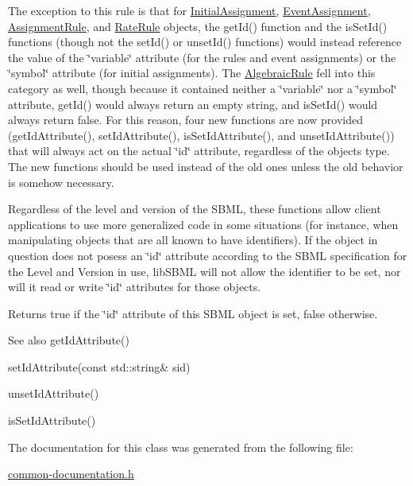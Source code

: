The exception to this rule is that for \hyperlink{class_initial_assignment}{Initial\+Assignment}, \hyperlink{class_event_assignment}{Event\+Assignment}, \hyperlink{class_assignment_rule}{Assignment\+Rule}, and \hyperlink{class_rate_rule}{Rate\+Rule} objects, the get\+Id() function and the is\+Set\+Id() functions (though not the set\+Id() or unset\+Id() functions) would instead reference the value of the \char`\"{}variable\char`\"{} attribute (for the rules and event assignments) or the \char`\"{}symbol\char`\"{} attribute (for initial assignments). The \hyperlink{class_algebraic_rule}{Algebraic\+Rule} fell into this category as well, though because it contained neither a \char`\"{}variable\char`\"{} nor a \char`\"{}symbol\char`\"{} attribute, get\+Id() would always return an empty string, and is\+Set\+Id() would always return {\ttfamily false}. For this reason, four new functions are now provided (get\+Id\+Attribute(), set\+Id\+Attribute(), is\+Set\+Id\+Attribute(), and unset\+Id\+Attribute()) that will always act on the actual \char`\"{}id\char`\"{} attribute, regardless of the object\textquotesingle{}s type. The new functions should be used instead of the old ones unless the old behavior is somehow necessary.

Regardless of the level and version of the S\+B\+ML, these functions allow client applications to use more generalized code in some situations (for instance, when manipulating objects that are all known to have identifiers). If the object in question does not posess an \char`\"{}id\char`\"{} attribute according to the S\+B\+ML specification for the Level and Version in use, lib\+S\+B\+ML will not allow the identifier to be set, nor will it read or write \char`\"{}id\char`\"{} attributes for those objects.

\begin{DoxyReturn}{Returns}
{\ttfamily true} if the \char`\"{}id\char`\"{} attribute of this S\+B\+ML object is set, {\ttfamily false} otherwise.
\end{DoxyReturn}
\begin{DoxySeeAlso}{See also}
get\+Id\+Attribute() 

set\+Id\+Attribute(const std\+::string\& sid) 

unset\+Id\+Attribute() 

is\+Set\+Id\+Attribute() 
\end{DoxySeeAlso}


The documentation for this class was generated from the following file\+:\begin{DoxyCompactItemize}
\item 
\hyperlink{common-documentation_8h}{common-\/documentation.\+h}\end{DoxyCompactItemize}
